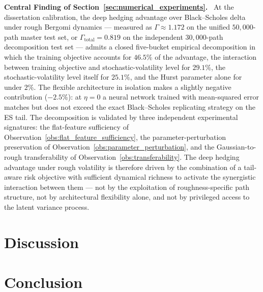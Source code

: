 \documentclass[12pt,a4paper]{article}
\theoremstyle{definition}
\theoremstyle{plain}
\theoremstyle{remark}
\theoremstyle{plain}
\newenvironment{centralfinding}
  {\begin{mdframed}[linewidth=1pt, skipabove=1em, skipbelow=1em]\textbf{Central Finding of Section~\ref{sec:numerical_experiments}.}\ }
  {\end{mdframed}}
\begin{document}
\begin{centralfinding}\label{cf:section6}\label{thm:central_finding}
At the dissertation calibration, the deep hedging advantage over Black--Scholes delta under rough Bergomi dynamics --- measured as $\Gamma \approx 1.172$ on the unified $50{,}000$-path master test set, or $\Gamma_{\mathrm{total}} = 0.819$ on the independent $30{,}000$-path decomposition test set --- admits a closed five-bucket empirical decomposition in which the training objective accounts for $46.5\%$ of the advantage, the interaction between training objective and stochastic-volatility level for $29.1\%$, the stochastic-volatility level itself for $25.1\%$, and the Hurst parameter alone for under $2\%$. The flexible architecture in isolation makes a slightly negative contribution ($-2.5\%$): at $\eta = 0$ a neural network trained with mean-squared error matches but does not exceed the exact Black--Scholes replicating strategy on the ES tail. The decomposition is validated by three independent experimental signatures: the flat-feature sufficiency of Observation~\ref{obs:flat_feature_sufficiency}, the parameter-perturbation preservation of Observation~\ref{obs:parameter_perturbation}, and the Gaussian-to-rough transferability of Observation~\ref{obs:transferability}. The deep hedging advantage under rough volatility is therefore driven by the combination of a tail-aware risk objective with sufficient dynamical richness to activate the synergistic interaction between them --- not by the exploitation of roughness-specific path structure, not by architectural flexibility alone, and not by privileged access to the latent variance process.
\end{centralfinding}

\newpage

\section{Discussion}
\label{sec:discussion}
\newpage

\section{Conclusion}
\label{sec:conclusion}
\end{document}
